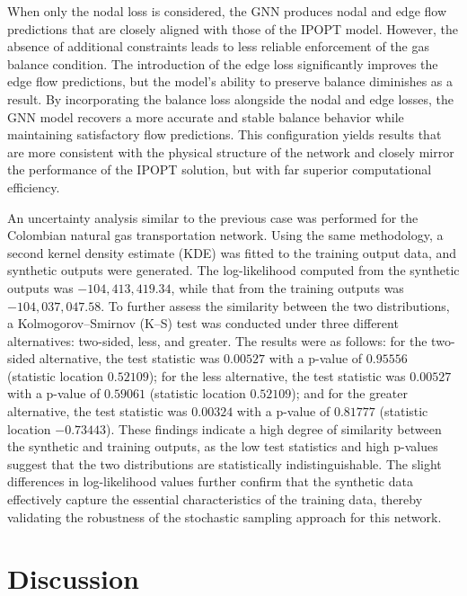 When only the nodal loss is considered, the GNN produces nodal and edge flow predictions that are closely aligned with those of the IPOPT model. However, the absence of additional constraints leads to less reliable enforcement of the gas balance condition. The introduction of the edge loss significantly improves the edge flow predictions, but the model's ability to preserve balance diminishes as a result. By incorporating the balance loss alongside the nodal and edge losses, the GNN model recovers a more accurate and stable balance behavior while maintaining satisfactory flow predictions. This configuration yields results that are more consistent with the physical structure of the network and closely mirror the performance of the IPOPT solution, but with far superior computational efficiency.



An uncertainty analysis similar to the previous case was performed for the Colombian natural gas transportation network. Using the same methodology, a second kernel density estimate (KDE) was fitted to the training output data, and synthetic outputs were generated. The log-likelihood computed from the synthetic outputs was \(-104{,}413{,}419.34\), while that from the training outputs was \(-104{,}037{,}047.58\). To further assess the similarity between the two distributions, a Kolmogorov–Smirnov (K–S) test was conducted under three different alternatives: two-sided, less, and greater. The results were as follows: for the two-sided alternative, the test statistic was \(0.00527\) with a p-value of \(0.95556\) (statistic location \(0.52109\)); for the less alternative, the test statistic was \(0.00527\) with a p-value of \(0.59061\) (statistic location \(0.52109\)); and for the greater alternative, the test statistic was \(0.00324\) with a p-value of \(0.81777\) (statistic location \(-0.73443\)). These findings indicate a high degree of similarity between the synthetic and training outputs, as the low test statistics and high p-values suggest that the two distributions are statistically indistinguishable. The slight differences in log-likelihood values further confirm that the synthetic data effectively capture the essential characteristics of the training data, thereby validating the robustness of the stochastic sampling approach for this network.





\section{Discussion}


